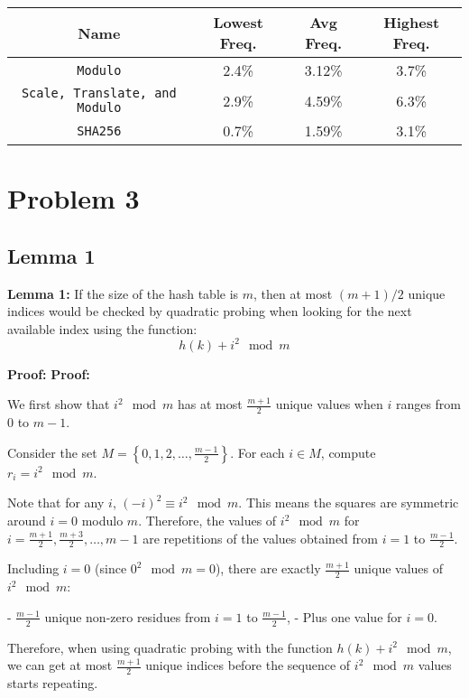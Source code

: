 \documentclass{cs1204}
\begin{document}
\begin{tabular}{|c|c|c|c|}
    \hline
    \textbf{Name} & \textbf{Lowest Freq.} & \textbf{Avg Freq.} & \textbf{Highest Freq.} \\
    \hline
    \texttt{Modulo} & 2.4\% & 3.12\% & 3.7\% \\
    \texttt{Scale, Translate, and Modulo} & 2.9\% & 4.59\% & 6.3\% \\
    \texttt{SHA256} & 0.7\% & 1.59\% & 3.1\% \\
    \hline
\end{tabular}

\newpage

\section*{Problem 3}

\subsection*{Lemma 1}
\textbf{Lemma 1:} If the size of the hash table is $m$, then at most $(m + 1)/2$ unique indices would be checked by
quadratic probing when looking for the next available index using the function:
\[ h(k) + i^2 \mod m \]

\textbf{Proof:}
\textbf{Proof:}

We first show that \( i^2 \mod m \) has at most \( \frac{m + 1}{2} \) unique values when \( i \) ranges from \( 0 \) to \( m - 1 \).

Consider the set \( M = \left\{ 0, 1, 2, \dotsc, \frac{m - 1}{2} \right\} \). For each \( i \in M \), compute \( r_i = i^2 \mod m \).

Note that for any \( i \), \( (-i)^2 \equiv i^2 \mod m \). This means the squares are symmetric around \( i = 0 \) modulo \( m \). Therefore, the values of \( i^2 \mod m \) for \( i = \frac{m + 1}{2}, \frac{m + 3}{2}, \dotsc, m - 1 \) are repetitions of the values obtained from \( i = 1 \) to \( \frac{m - 1}{2} \).

Including \( i = 0 \) (since \( 0^2 \mod m = 0 \)), there are exactly \( \frac{m + 1}{2} \) unique values of \( i^2 \mod m \):

- \( \frac{m - 1}{2} \) unique non-zero residues from \( i = 1 \) to \( \frac{m - 1}{2} \),
- Plus one value for \( i = 0 \).

Therefore, when using quadratic probing with the function \( h(k) + i^2 \mod m \), we can get at most \( \frac{m + 1}{2} \) unique indices before the sequence of \( i^2 \mod m \) values starts repeating.
\end{document}
